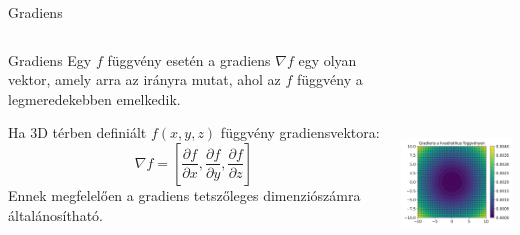 \documentclass[english, aspectratio=169]{beamer}
\begin{document}
\begin{frame}{Gradiens}
\begin{columns}
\begin{column}{.5\textwidth}
\begin{block}{Gradiens}
Egy $f$ függvény esetén a gradiens $\nabla f$ egy olyan vektor, amely arra az irányra mutat, ahol az $f$ függvény a legmeredekebben emelkedik.\par\smallskip
Ha 3D térben definiált $f\left( x,y,z \right)$ függvény gradiensvektora: 
\[
\nabla f = \left[ \frac{\partial f}{\partial x}, \frac{\partial f}{\partial y}, \frac{\partial f}{\partial z} \right]
\]
Ennek megfelelően a gradiens tetszőleges dimenziószámra általánosítható. 
\end{block}
\end{column}
\begin{column}{.5\textwidth}
\begin{center}
\includegraphics[width=7cm, height=7cm, keepaspectratio]{images/regresszio_17.png}
\end{center}
\end{column}
\end{columns}
\end{frame}
\end{document}
